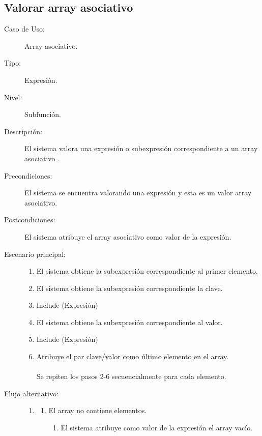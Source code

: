 \subsection {Valorar array asociativo}
\begin{framed}
\FloatBarrier
\begin{description}
   \item[Caso de Uso:]  Array asociativo.
   \item [Tipo:] Expresión.
   \item[Nivel:]  Subfunción.
   \item[Descripción:] 
   El sistema valora una expresión o subexpresión correspondiente a
   un array asociativo .
   \item[Precondiciones:] 
   El sistema se encuentra valorando una expresión y esta es un valor array asociativo.
   \item[Postcondiciones:] 
   El sistema atribuye el array asociativo como valor de la expresión.
   \item[Escenario principal:] \hfill
   \begin{enumerate}
   \item El sistema obtiene la subexpresión correspondiente al primer elemento.
   \item El sistema obtiene la subexpresión correspondiente la clave.
   \item Include (Expresión)
   \item El sistema obtiene la subexpresión correspondiente al valor.
   \item Include (Expresión)
   \item Atribuye el par clave/valor como último elemento en el array.\\\\\hfill\hfill
   Se repiten los pasos 2-6 secuencialmente para cada elemento.
   \end{enumerate}
    \item[Flujo alternativo:] \hfill 
   \begin{enumerate} \itemsep1pt \parskip0pt 
   \setcounter{enumi}{0}
   \renewcommand{\labelenumi}{}
   \renewcommand{\labelenumiii}{\arabic{enumiii}.}
   \renewcommand{\labelenumii}{\arabic{enumi}\alph{enumii}.}
      \item 
      \begin {enumerate}
         \setcounter{enumii}{0}
         \item El array no contiene elementos.
         \begin{enumerate}
         \item El sistema atribuye como valor de la expresión el array vacío.
         \end{enumerate}
      \end{enumerate}
   \end{enumerate}
\end{description}
 \FloatBarrier
\end{framed}
